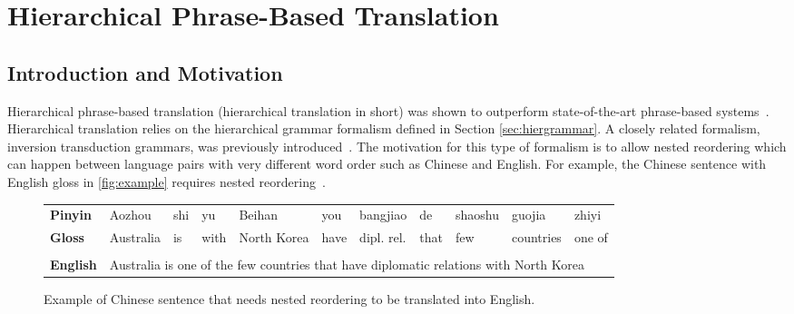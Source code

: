 \section{Hierarchical Phrase-Based Translation}
\label{sec:hierarchicalPhraseBasedTranslation}

  \subsection{Introduction and Motivation} \label{sec:hierintro}

  Hierarchical phrase-based translation (hierarchical translation in short) was shown to
  outperform state-of-the-art phrase-based systems~\citep{chiang:2005:ACL,chiang:2007:CL}.
  Hierarchical translation relies on the hierarchical grammar formalism defined in Section \ref{sec:hiergrammar}. A closely related formalism, inversion
  transduction grammars, was previously introduced~\citep{wu:1995:IJCAI,wu:1997:CL}. The motivation for this type
  of formalism is to allow nested reordering which can happen between language pairs with very different word order such as 
  Chinese and English. For example, the Chinese sentence with English gloss in \autoref{fig:example} requires nested reordering~\citep{chiang:2007:CL}.


  \begin{figure}
    \begin{center}
      \begin{footnotesize}
      \begin{tabular}{p{0.9cm} p{1cm} p{0.2cm} p{0.3cm} p{1.9cm} p{0.3cm} p{1.5cm} p{0.3cm} p{0.9cm} p{1cm} p{0.9cm}}
        \textbf{Pinyin}  & Aozhou & shi & yu & Beihan & you & bangjiao & de & shaoshu & guojia & zhiyi \\
        \textbf{Gloss} & Australia & is & with & North Korea & have & dipl. rel. & that & few & countries & one of \\
         & & & & & & & & & & \\
        \textbf{English} & \multicolumn{10}{l}{Australia is one of the few countries that have diplomatic relations with North Korea} \\
      \end{tabular}
      \end{footnotesize}
    \end{center}
    \caption{Example of Chinese sentence that needs nested reordering to be translated into English.}
    \label{fig:example}
  \end{figure}

